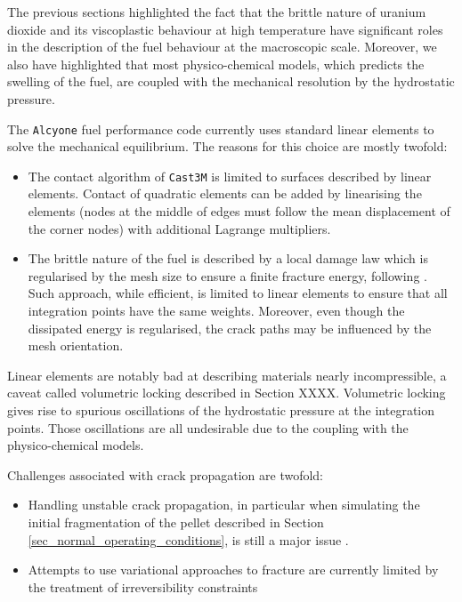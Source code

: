 The previous sections highlighted the fact that the brittle nature of
uranium dioxide and its viscoplastic behaviour at high temperature have
significant roles in the description of the fuel behaviour at the
macroscopic scale. Moreover, we also have highlighted that most
physico-chemical models, which predicts the swelling of the fuel, are
coupled with the mechanical resolution by the hydrostatic pressure.

The \texttt{Alcyone} fuel performance code currently uses standard linear
elements to solve the mechanical equilibrium. The reasons for this
choice are mostly twofold:

\begin{itemize}
    \item The contact algorithm of \texttt{Cast3M} is limited to surfaces described by
    linear elements. Contact of quadratic elements can be added by
    linearising the elements (nodes at the middle of edges must follow the
    mean displacement of the corner nodes) with additional Lagrange
    multipliers.
    \item The brittle nature of the fuel is described by a local damage law
    \cite{michel_new_2017} which is regularised by the mesh size to ensure a
    finite fracture energy, following \cite{hillerborg_analysis_1976}. Such
    approach, while efficient, is limited to linear elements to ensure
    that all integration points have the same weights. Moreover, even
    though the dissipated energy is regularised, the crack paths may be
    influenced by the mesh orientation.
\end{itemize}

Linear elements are notably bad at describing materials nearly
incompressible, a caveat called volumetric locking described in Section
XXXX. Volumetric locking gives rise to spurious
oscillations of the hydrostatic pressure at the integration points.
Those oscillations are all undesirable due to the coupling with the
physico-chemical models.

Challenges associated with crack propagation are twofold:

\begin{itemize}
    \item Handling unstable crack propagation, in particular when simulating the
    initial fragmentation of the pellet described in Section
    \ref{sec_normal_operating_conditions}, is still a major issue
    \cite{michel_new_2017, lu_schema_2019}.
    \item Attempts to use variational approaches to fracture are currently
    limited by the treatment of irreversibility constraints
    \cite{helfer_modelisation_2017, lu_schema_2019}
\end{itemize}